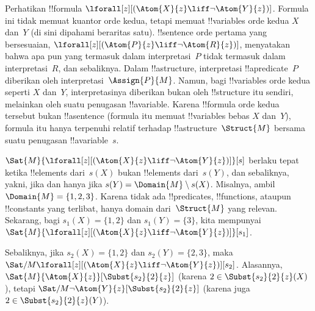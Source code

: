 \documentclass[../../../include/open-logic-section]{subfiles}
\begin{document}
\begin{ex}
  Perhatikan !!{formula} $\lforall[z][(\Atom{X}{z} \liff \lnot
    \Atom{Y}{z})]$. Formula ini tidak memuat kuantor orde kedua, tetapi
  memuat !!{variable}s orde kedua $X$ dan~$Y$ (di sini dipahami beraritas
  satu). !!{sentence} orde pertama yang bersesuaian,
  $\lforall[z][(\Atom{P}{z} \liff \lnot \Atom{R}{z})]$, menyatakan bahwa
  apa pun yang termasuk dalam interpretasi~$P$ tidak termasuk dalam
  interpretasi~$R$, dan sebaliknya. Dalam !!a{structure}, interpretasi
  !!a{predicate}~$P$ diberikan oleh interpretasi~$\Assign{P}{M}$. Namun,
  bagi !!{variable}s orde kedua seperti $X$ dan~$Y$, interpretasinya diberikan
  bukan oleh !!{structure} itu sendiri, melainkan oleh suatu penugasan
  !!a{variable}. Karena !!{formula} orde kedua tersebut bukan
  !!a{sentence} (formula itu memuat !!{variable}s bebas $X$ dan~$Y$), formula
  itu hanya terpenuhi relatif terhadap !!a{structure}~$\Struct{M}$ bersama
  suatu penugasan !!a{variable}~$s$.

  $\Sat{M}{\lforall[z][(\Atom{X}{z} \liff \lnot \Atom{Y}{z})]}[s]$
  berlaku tepat ketika !!{element}s dari~$s(X)$ bukan !!{element}s
  dari~$s(Y)$, dan sebaliknya, yakni, jika dan hanya jika
  $s(Y) = \Domain{M} \setminus s(X)$. Misalnya, ambil
  $\Domain{M} = \{1, 2, 3\}$. Karena tidak ada !!{predicate}s,
  !!{function}s, ataupun !!{constant}s yang terlibat, hanya domain
  dari~$\Struct{M}$ yang relevan. Sekarang, bagi $s_1(X) = \{1, 2\}$ dan
  $s_1(Y) = \{3\}$, kita mempunyai
  $\Sat{M}{\lforall[z][(\Atom{X}{z} \liff \lnot
      \Atom{Y}{z})]}[s_1]$.

  Sebaliknya, jika $s_2(X) = \{1, 2\}$ dan $s_2(Y) = \{2, 3\}$, maka
  $\Sat/{M}{\lforall[z][(\Atom{X}{z} \liff \lnot
      \Atom{Y}{z})]}[s_2]$. Alasannya,
  $\Sat{M}{\Atom{X}{z}}[\Subst{s_2}{2}{z}]$ (karena
  $2 \in \Subst{s_2}{2}{z}(X)$), tetapi
  $\Sat/{M}{\lnot \Atom{Y}{z}}[\Subst{s_2}{2}{z}]$ (karena juga
  $2 \in \Subst{s_2}{2}{z}(Y)$).
\end{ex}
\end{document}

